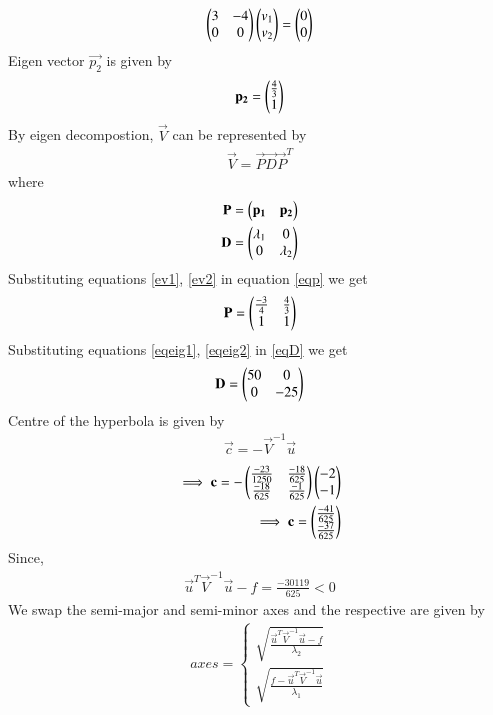 \documentclass[journal,12pt,twocolumn]{IEEEtran}
\begin{document}
\begin{align}
    \begin{pmatrix}3&-4\\0&0\end{pmatrix}\begin{pmatrix}v_1\\v_2\end{pmatrix}=\begin{pmatrix}0\\0\end{pmatrix}\label{eig2}
\end{align}
Eigen vector $\vec{p_2}$ is given by
\begin{align}
        \mathbf{p_2}=\begin{pmatrix}\frac{4}{3}\\1\end{pmatrix}\label{ev2}
\end{align}
By eigen decompostion, $\vec{V}$ can be represented by
\begin{align}
    \vec{V}=\vec{P}\vec{D}\vec{P}^T\label{evd}
\end{align}
where 
\begin{align}
        \mathbf{P}=\begin{pmatrix}\mathbf{p_1} & \mathbf{p_2}\end{pmatrix}\label{eqp}\\
    \mathbf{D}=\begin{pmatrix}\lambda_1 & 0 \\0 & \lambda_2\end{pmatrix}\label{eqD}
\end{align}
Substituting equations \eqref{ev1}, \eqref{ev2} in equation \eqref{eqp} we get 
\begin{align}
    \mathbf{P}=\begin{pmatrix}\frac{-3}{4}&\frac{4}{3}\\1&1\end{pmatrix}\label{eqP}
\end{align}
Substituting equations \eqref{eqeig1}, \eqref{eqeig2} in \eqref{eqD} we get
\begin{align}
       \mathbf{D}=\begin{pmatrix}50 & 0\\0 & -25\end{pmatrix}\label{eqDD}
\end{align}
Centre of the hyperbola is given by 
\begin{align}
    \vec{c}=-\vec{V}^{-1}\vec{u}
\end{align}
\begin{align}
    \implies\mathbf{c}=-\begin{pmatrix}\frac{-23}{1250}&\frac{-18}{625}\\\frac{-18}{625}&\frac{-1}{625}\end{pmatrix}\begin{pmatrix}-2\\-1\end{pmatrix}\\
    \implies\mathbf{c}=\begin{pmatrix}\frac{-41}{625}\\\frac{-37}{625}\end{pmatrix}
\end{align}
Since,
\begin{align}
    \vec{u}^T\vec{V}^{-1}\vec{u}-f = \frac{-30119}{625}<0\label{cond}
\end{align} 
We swap the semi-major and semi-minor axes and the respective are given by
\begin{align}
axes=
\begin{cases}
\sqrt{\frac{\vec{u}^T\vec{V}^{-1}\vec{u}-f}{\lambda_2}}\\ \sqrt{\frac{f-\vec{u}^T\vec{V}^{-1}\vec{u}}{\lambda_1}}
\end{cases}
\end{align}
\end{document}
